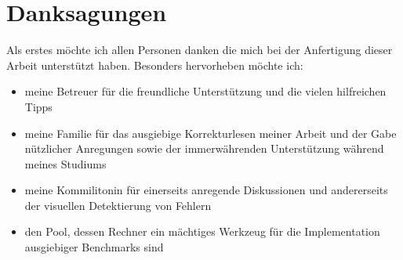 \chapter*{Danksagungen}

Als erstes möchte ich allen Personen danken die mich bei der Anfertigung dieser Arbeit unterstützt haben. Besonders hervorheben möchte ich:

 
   \begin{itemize}
    \item meine Betreuer für die freundliche Unterstützung und die vielen hilfreichen Tipps
    \item meine Familie für das ausgiebige Korrekturlesen meiner Arbeit und der Gabe nützlicher Anregungen sowie der immerwährenden Unterstützung während meines Studiums
    \item meine Kommilitonin für einerseits anregende Diskussionen und andererseits der visuellen Detektierung von Fehlern
    \item den Pool, dessen Rechner ein mächtiges Werkzeug für die Implementation ausgiebiger Benchmarks sind
   \end{itemize}